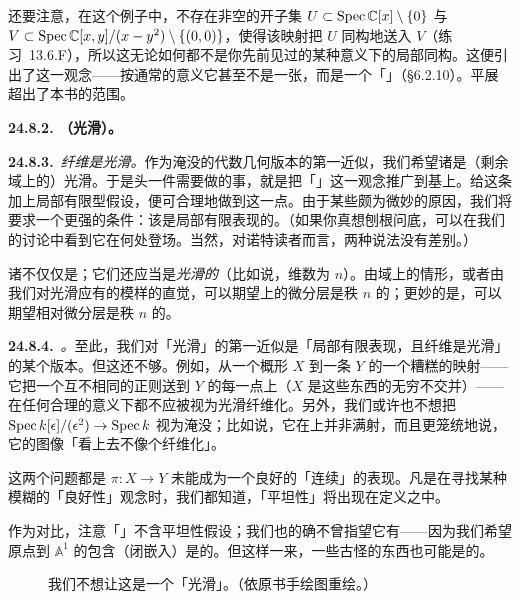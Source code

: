 还要注意，在这个例子中，不存在非空的\trZariski{}开子集 $U\subset\operatorname{Spec}\mathbb{C}[x]\setminus\{0\}$ 与 $V\subset\operatorname{Spec}\mathbb{C}[x,y]/(x-y^2)\setminus\{(0,0)\}$，使得该映射把 $U$ 同构地送入 $V$（\mbox{练习~13.6.F}），所以这无论如何都不是你先前见过的某种意义下的局部同构。这便引出了\trEtale{}\trTopology{}这一观念——按通常的意义它甚至不是一张\trTopology，而是一个「\trGrothendieck{}\trTopology」（\S6.2.10）。平展\trTopology{}超出了本书的范围。

\textbf{24.8.2. \trSubmersion{}（光滑\trMorphism）。}\quad

\textbf{24.8.3.}\ \emph{纤维是光滑\trVariety。}\quad 作为淹没的代数几何版本的第一近似，我们希望诸\trFiber{}是（剩余域上的）光滑\trVariety。于是头一件需要做的事，就是把「\trVariety」这一观念推广到基上。给这条\trMorphism{}加上局部有限型假设，便可合理地做到这一点。由于某些颇为微妙的原因，我们将要求一个更强的条件：该\trMorphism{}是局部有限表现的。（如果你真想刨根问底，可以在我们的讨论中看到它在何处登场。当然，对诺特读者而言，两种说法没有差别。）

诸\trFiber{}不仅仅是\trVariety；它们还应当是\emph{光滑的}\trVariety（比如说，维数为 $n$）。由域上\trSmoothness{}的情形，或者由我们对光滑\trVariety{}应有的模样的直觉，可以期望\trFiber{}上的微分层是秩 $n$ 的\trLocallyFreeSheaf；更妙的是，可以期望相对微分层是秩 $n$ 的\trLocallyFreeSheaf。

\textbf{24.8.4.}\ \emph{\trFlatness。}\quad 至此，我们对「光滑\trMorphism」的第一近似是「局部有限表现，且纤维是光滑\trVariety」的某个版本。但这还不够。例如，从一个概形 $X$ 到一条\trCurve{} $Y$ 的一个糟糕的映射——它把一个互不相同的正则\trVariety{}送到 $Y$ 的每一点上（$X$ 是这些东西的无穷不交并）——在任何合理的意义下都不应被视为光滑纤维化。另外，我们或许也不想把 $\operatorname{Spec} k[\epsilon]/(\epsilon^2)\to\operatorname{Spec} k$ 视为淹没；比如说，它在\trTangentSpace{}上并非满射，而且更笼统地说，它的图像「看上去不像个纤维化」。

这两个问题都是 $\pi\colon X\to Y$ 未能成为一个良好的「连续」\trFamily{}的表现。凡是在寻找某种模糊的「良好性」观念时，我们都知道，「平坦性」将出现在定义之中。

作为对比，注意「\trUnramified」不含平坦性假设；我们也的确不曾指望它有——因为我们希望原点到 $\mathbb{A}^1$ 的包含（闭嵌入）是\trUnramified{}的。但这样一来，一些古怪的东西也可能是\trUnramified{}的。
\begin{figure}[htbp]
\centering
{}
\caption{我们不想让这是一个「光滑\trMorphism」。（依原书手绘图重绘。）}\label{fig:not-want-smooth}
\end{figure}

